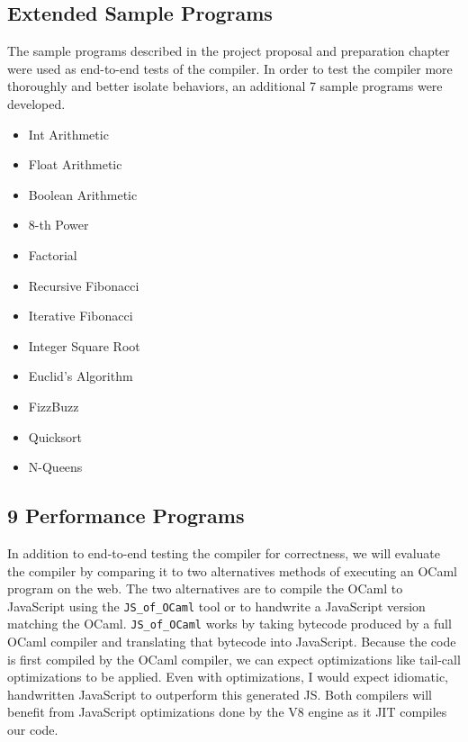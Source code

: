 \documentclass[12pt,a4paper,twoside,openright]{report}
\newcommand{\JSofOCaml}{{\tt JS\_of\_OCaml} }
\begin{document}
\subsection{Extended Sample Programs}
The sample programs described in the project proposal and preparation chapter were used as end-to-end tests of the compiler.
In order to test the compiler more thoroughly and better isolate behaviors, an additional 7 sample programs were developed.
\begin{multicols}{3}
\begin{itemize}
\itemsep-.2em
\item Int Arithmetic
\item Float Arithmetic
\item Boolean Arithmetic
\item 8-th Power
\item Factorial
\item Recursive Fibonacci
\item Iterative Fibonacci
\item Integer Square Root
\item Euclid's Algorithm
\item FizzBuzz
\item Quicksort
\item N-Queens
\end{itemize}
\end{multicols}

\subsection{9 Performance Programs}
In addition to end-to-end testing the compiler for correctness, we will evaluate the compiler by comparing it to two alternatives methods of executing an OCaml program on the web.
The two alternatives are to compile the OCaml to JavaScript using the \JSofOCaml tool or to handwrite a JavaScript version matching the OCaml.
\JSofOCaml works by taking bytecode produced by a full OCaml compiler and translating that bytecode into JavaScript.
Because the code is first compiled by the OCaml compiler, we can expect optimizations like tail-call optimizations to be applied.
Even with optimizations, I would expect idiomatic, handwritten JavaScript to outperform this generated JS.
Both compilers will benefit from JavaScript optimizations done by the V8 engine as it JIT compiles our code.
\end{document}
